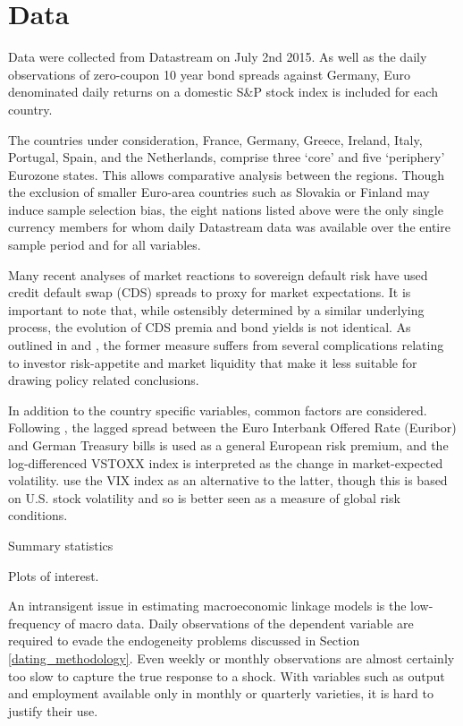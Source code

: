 \documentclass[/../base.tex]{subfiles}
\begin{document}
\section{Data}
\label{data}

Data were collected from Datastream on July 2nd 2015. As well as the daily observations of zero-coupon 10 year bond spreads against Germany, Euro denominated daily returns on a domestic S\&P stock index is included for each country.

The countries under consideration, France, Germany, Greece, Ireland, Italy, Portugal, Spain, and the Netherlands, comprise three `core' and five `periphery' Eurozone states. This allows comparative analysis between the regions. Though the exclusion of smaller Euro-area countries such as Slovakia or Finland may induce sample selection bias, the eight nations listed above were the only single currency members for whom daily Datastream data was available over the entire sample period and for all variables. 

Many recent analyses of market reactions to sovereign default risk have used credit default swap (CDS) spreads to proxy for market expectations. It is important to note that, while ostensibly determined by a similar underlying process, the evolution of CDS premia and bond yields is not identical. As outlined in  \cite{fontana2010analysis} and \cite{beirne2013pricing}, the former measure suffers from several complications relating to investor risk-appetite and market liquidity that make it less suitable for drawing policy related conclusions.

In addition to the country specific variables, common factors are considered. Following \cite{metiu2012sovereign}, the lagged spread between the Euro Interbank Offered Rate (Euribor) and German Treasury bills is used as a general European risk premium, and the log-differenced VSTOXX index is interpreted as the change in market-expected volatility. \cite{giordano2013pure} use the VIX index as an alternative to the latter, though this is based on U.S. stock volatility and so is better seen as a measure of global risk conditions. 

Summary statistics 

Plots of interest.

An intransigent issue in estimating macroeconomic linkage models is the low-frequency of macro data. Daily observations of the dependent variable are required to evade the endogeneity problems discussed in Section \ref{dating_methodology}. Even weekly or monthly observations are almost certainly too slow to capture the true response to a shock. With variables such as output and employment available only in monthly or quarterly varieties, it is hard to justify their use.
\end{document}
